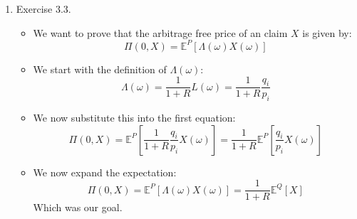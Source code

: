 \documentclass[12pt]{article}
\begin{document}
\begin{enumerate}
\begin{itemize}
\end{itemize}
  \item Exercise 3.3.
  \begin{itemize}
      \item We want to prove that the arbitrage free price of an claim $X$ is given by:
      $$\Pi (0,X) = \mathbb{E}^P[\Lambda (\omega) X(\omega)]$$
      \item We start with the definition of $\Lambda (\omega)$:
      $$\Lambda (\omega) = \frac{1}{1+R} L(\omega) = \frac{1}{1+R} \frac{q_i}{p_i}$$
      \item We now substitute this into the first equation:
            $$\Pi (0,X) = \mathbb{E}^P[\frac{1}{1+R} \frac{q_i}{p_i} X(\omega)] = \frac{1}{1+R}\mathbb{E}^P[ \frac{q_i}{p_i} X(\omega)]$$
        \item We now expand the expectation:
        $$\Pi (0,X)  = \mathbb{E}^P[\Lambda (\omega) X(\omega)] = \frac{1}{1+R}\mathbb{E}^Q [X] $$
        Which was our goal.
  \end{itemize}

\end{enumerate}
\end{document}
